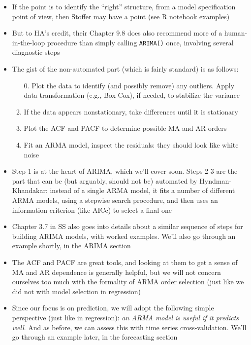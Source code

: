 \documentclass{article}
\begin{document}
\begin{itemize}
\item If the point is to identify the ``right'' structure, from a model
  specification point of view, then Stoffer may have a point (see R notebook 
  examples) 

\item But to HA's credit, their Chapter 9.8 does also recommend more of a 
  human-in-the-loop procedure than simply calling \verb|ARIMA()| once, involving
  several diagnostic steps 

\item The gist of the non-automated part (which is fairly standard) is as
  follows: 
  \begin{enumerate}
  \item[0.] Plot the data to identify (and possibly remove) any outliers. 
   Apply data transformation (e.g., Box-Cox), if needed, to stabilize the
   variance   
  \item If the data appears nonstationary, take differences until it is
    stationary 
  \item Plot the ACF and PACF to determine possible MA and AR orders 
  \item Fit an ARMA model, inspect the residuals: they should look like white 
    noise 
  \end{enumerate}

\item Step 1 is at the heart of ARIMA, which we'll cover soon. Steps 2-3 are the
  part that can be (but arguably, should not be) automated by Hyndman-Khandakar:  
  instead of a single ARMA model, it fits a number of different ARMA models,
  using a stepwise search procedure, and then uses an information criterion
  (like AICc) to select a final one 

\item Chapter 3.7 in SS also goes into details about a similar sequence of steps
  for building ARIMA models, with worked examples. We'll also go through an
  example shortly, in the ARIMA section 

\item The ACF and PACF are great tools, and looking at them to get a sense of MA
  and AR dependence is generally helpful, but we will not concern ourselves too
  much with the formality of ARMA order selection (just like we did not with
  model selection in regression) 

\item Since our focus is on prediction, we will adopt the following simple
  perspective (just like in regression): \emph{an ARMA model is useful if it
    predicts well}. And as before, we can assess this with time series
  cross-validation. We'll go through an example later, in the forecasting
  section   
\end{itemize}
\end{document}
